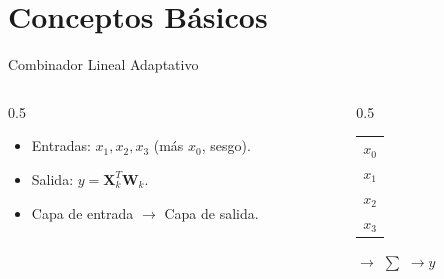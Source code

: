 \documentclass[aspectratio=169,utf8,spanish]{beamer}
\begin{document}
\section{Conceptos Básicos}

\begin{frame}{Combinador Lineal Adaptativo}
  \begin{columns}
    \begin{column}{0.5\textwidth}
      \begin{itemize}
        \item Entradas: $x_1, x_2, x_3$ (más $x_0$, sesgo).
        \item Salida: $y = \mathbf{X}_k^T \mathbf{W}_k$.
        \item Capa de entrada $\to$ Capa de salida.
      \end{itemize}
    \end{column}
    \begin{column}{0.5\textwidth}
      \begin{center}
        \begin{tabular}{c}
          $x_0$ \\
          $x_1$ \\
          $x_2$ \\
          $x_3$
        \end{tabular}
        $\to$
        $\displaystyle\sum$
        $\to y$
      \end{center}
    \end{column}
  \end{columns}
\end{frame}
\end{document}
